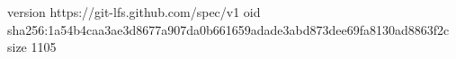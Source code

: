 version https://git-lfs.github.com/spec/v1
oid sha256:1a54b4caa3ae3d8677a907da0b661659adade3abd873dee69fa8130ad8863f2c
size 1105
